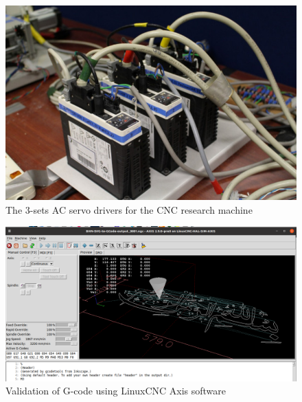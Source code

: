 \begin{figure}
	\centering
	\includegraphics[width=1.00\textwidth]{Images/Chap4/CNC/CNC-Research-Machine-3-Sets-Servo-Drives.jpg} 
	\caption{The 3-sets AC servo drivers for the CNC research machine}
	\label{CNC-Research-Machine-3-Sets-Servo-Drives.jpg}
\end{figure}

\clearpage
\pagebreak
\begin{landscape}
	\begin{figure}
	\caption{Validation of G-code using LinuxCNC Axis software}	
	\label{BHN-Validation-in-LinuxCNC-Axis-Screenshot.png}		
	\centering
	\includegraphics[width=1.70\textwidth]{Chap2/Images/BHN-Validation-in-LinuxCNC-Axis-Screenshot.png} 
	\end{figure}
\end{landscape}


